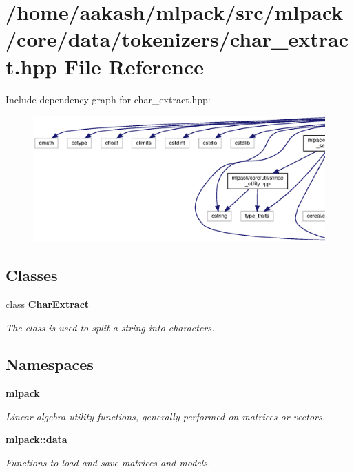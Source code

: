 \section{/home/aakash/mlpack/src/mlpack/core/data/tokenizers/char\+\_\+extract.hpp File Reference}
\label{char__extract_8hpp}
Include dependency graph for char\+\_\+extract.\+hpp\+:
\nopagebreak
\begin{figure}[H]
\begin{center}
\leavevmode
\includegraphics[width=350pt]{char__extract_8hpp__incl}
\end{center}
\end{figure}
\subsection*{Classes}
\begin{DoxyCompactItemize}
\item 
class \textbf{ Char\+Extract}
\begin{DoxyCompactList}\small\item\em The class is used to split a string into characters. \end{DoxyCompactList}\end{DoxyCompactItemize}
\subsection*{Namespaces}
\begin{DoxyCompactItemize}
\item 
 \textbf{ mlpack}
\begin{DoxyCompactList}\small\item\em Linear algebra utility functions, generally performed on matrices or vectors. \end{DoxyCompactList}\item 
 \textbf{ mlpack\+::data}
\begin{DoxyCompactList}\small\item\em Functions to load and save matrices and models. \end{DoxyCompactList}\end{DoxyCompactItemize}


